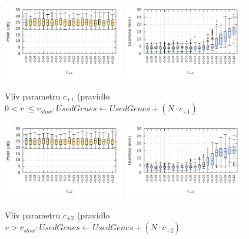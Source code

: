 {\begin{figure}[h]
    \centering
    \includegraphics[width=0.475\textwidth]{fig/plot/tuningabs-slowinc-30kg-psnr.pdf}
    \includegraphics[width=0.475\textwidth]{fig/plot/tuningabs-slowinc-30kg-utime.pdf}
    \caption{Vliv parametru $c_{+1}$ (pravidlo $0 < v~\leq v_\mathit{slow}: \mathit{UsedGenes} \leftarrow \mathit{UsedGenes} + \left(N \cdot c_{+1}\right)$}
\end{figure}

\begin{figure}[h]
    \centering
    \includegraphics[width=0.475\textwidth]{fig/plot/tuningabs-fastinc-30kg-psnr.pdf}
    \includegraphics[width=0.475\textwidth]{fig/plot/tuningabs-fastinc-30kg-utime.pdf}
    \caption{Vliv parametru $c_{+2}$ (pravidlo $v > v_\mathit{slow}: \mathit{UsedGenes} \leftarrow \mathit{UsedGenes} + \left(N \cdot c_{+2}\right)$}
\end{figure}

}
